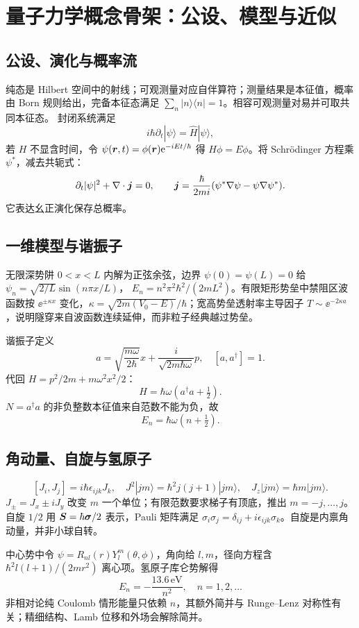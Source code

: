 \chapter{量子力学概念骨架：公设、模型与近似}
\section{公设、演化与概率流}
纯态是 Hilbert 空间中的射线；可观测量对应自伴算符；测量结果是本征值，概率由 Born 规则给出，完备本征态满足 $\sum_n|n\rangle\langle n|=1$。相容可观测量对易并可取共同本征态。
封闭系统满足
\[
i\hbar\partial_t|\psi\rangle=\hat H|\psi\rangle,
\]
若 $H$ 不显含时间，令 $\psi(\bm{r},t)=\phi(\bm{r})\mathrm e^{-iEt/\hbar}$ 得
$H\phi=E\phi$。将 Schrödinger 方程乘 $\psi^*$，减去共轭式：
\[
\partial_t|\psi|^2+\nabla\cdot\bm{j}=0,\qquad
\bm{j}=\frac{\hbar}{2mi}(\psi^*\nabla\psi-\psi\nabla\psi^*).
\]
它表达幺正演化保存总概率。

\section{一维模型与谐振子}
无限深势阱 $0<x<L$ 内解为正弦余弦，边界 $\psi(0)=\psi(L)=0$ 给
$\psi_n=\sqrt{2/L}\sin(n\pi x/L)$，
$E_n=n^2\pi^2\hbar^2/(2mL^2)$。有限矩形势垒中禁阻区波函数按
$\ee^{\pm\kappa x}$ 变化，$\kappa=\sqrt{2m(V_0-E)}/\hbar$；宽高势垒透射率主导因子
$T\sim\ee^{-2\kappa a}$，说明隧穿来自波函数连续延伸，而非粒子经典越过势垒。

谐振子定义
\[
a=\sqrt{\frac{m\omega}{2\hbar}}x+\frac{i}{\sqrt{2m\hbar\omega}}p,\quad
[a,a^\dagger]=1.
\]
代回 $H=p^2/2m+m\omega^2x^2/2$：
\[
H=\hbar\omega(a^\dagger a+\tfrac12).
\]
$N=a^\dagger a$ 的非负整数本征值来自范数不能为负，故
\[
\boxed{E_n=\hbar\omega(n+\tfrac12)}.
\]

\section{角动量、自旋与氢原子}
\[
[J_i,J_j]=i\hbar\epsilon_{ijk}J_k,\quad
J^2|jm\rangle=\hbar^2j(j+1)|jm\rangle,\quad
J_z|jm\rangle=\hbar m|jm\rangle.
\]
$J_\pm=J_x\pm iJ_y$ 改变 $m$ 一个单位；有限范数要求梯子有顶底，推出
$m=-j,\ldots,j$。自旋 $1/2$ 用
$\bm{S}=\hbar\bm{\sigma}/2$ 表示，Pauli 矩阵满足
$\sigma_i\sigma_j=\delta_{ij}+i\epsilon_{ijk}\sigma_k$。自旋是内禀角动量，并非小球自转。

中心势中令 $\psi=R_{nl}(r)Y_l^m(\theta,\phi)$，角向给 $l,m$，径向方程含
$\hbar^2l(l+1)/(2mr^2)$ 离心项。氢原子库仑势解得
\[
E_n=-\frac{13.6\,\mathrm{eV}}{n^2},\quad n=1,2,\ldots
\]
非相对论纯 Coulomb 情形能量只依赖 $n$，其额外简并与 Runge--Lenz 对称性有关；精细结构、Lamb 位移和外场会解除简并。

